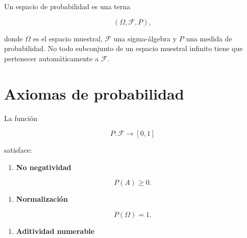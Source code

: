 \documentclass[
  spanish,
  10.5pt,
  letterpaper,
  DIV=11,
  numbers=noendperiod,
  oneside,
  open=any]{scrreprt}
\providecommand{\tightlist}{%
  \setlength{\itemsep}{0pt}\setlength{\parskip}{0pt}}
\theoremstyle{definition}
\theoremstyle{definition}
\theoremstyle{plain}
\theoremstyle{remark}
\begin{document}
\begin{tcolorbox}[enhanced jigsaw, arc=.35mm, bottomrule=.15mm, bottomtitle=1mm, breakable, colback=white, colbacktitle=quarto-callout-note-color!10!white, colframe=quarto-callout-note-color-frame, coltitle=black, left=2mm, leftrule=.75mm, opacityback=0, opacitybacktitle=0.6, rightrule=.15mm, title=\textcolor{quarto-callout-note-color}{\faInfo}\hspace{0.5em}{Modelo probabilístico}, titlerule=0mm, toprule=.15mm, toptitle=1mm]

Un espacio de probabilidad es una terna

\[
(\Omega,\mathcal{F},P),
\]

donde \(\Omega\) es el espacio muestral, \(\mathcal{F}\) una
sigma-álgebra y \(P\) una medida de probabilidad. No todo subconjunto de
un espacio muestral infinito tiene que pertenecer automáticamente a
\(\mathcal{F}\).

\end{tcolorbox}

\section*{Axiomas de probabilidad}\label{axiomas-de-probabilidad}


La función

\[
P:\mathcal{F}\to[0,1]
\]

satisface:

\begin{enumerate}
\def\labelenumi{\arabic{enumi}.}
\tightlist
\item
  \textbf{No negatividad}
\end{enumerate}

\[
P(A)\geq 0.
\]

\begin{enumerate}
\def\labelenumi{\arabic{enumi}.}
\setcounter{enumi}{1}
\tightlist
\item
  \textbf{Normalización}
\end{enumerate}

\[
P(\Omega)=1.
\]

\begin{enumerate}
\def\labelenumi{\arabic{enumi}.}
\setcounter{enumi}{2}
\tightlist
\item
  \textbf{Aditividad numerable}
\end{enumerate}
\end{document}
